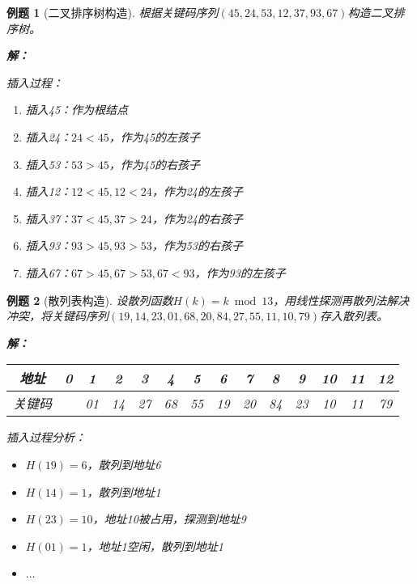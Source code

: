 \documentclass[12pt,a4paper]{amsart}
\newtheorem{example}{例题}[section]
\begin{document}
\begin{example}[二叉排序树构造]
根据关键码序列$(45,24,53,12,37,93,67)$构造二叉排序树。

\textbf{解：}
\begin{center}
\end{center}
插入过程：
\begin{enumerate}
\item 插入45：作为根结点
\item 插入24：$24 < 45$，作为45的左孩子
\item 插入53：$53 > 45$，作为45的右孩子
\item 插入12：$12 < 45, 12 < 24$，作为24的左孩子
\item 插入37：$37 < 45, 37 > 24$，作为24的右孩子
\item 插入93：$93 > 45, 93 > 53$，作为53的右孩子  
\item 插入67：$67 > 45, 67 > 53, 67 < 93$，作为93的左孩子
\end{enumerate}
\end{example}

\begin{example}[散列表构造]
设散列函数$H(k) = k \bmod 13$，用线性探测再散列法解决冲突，将关键码序列$(19,14,23,01,68,20,84,27,55,11,10,79)$存入散列表。

\textbf{解：}
\begin{center}
\begin{tabular}{|c|c|c|c|c|c|c|c|c|c|c|c|c|c|}
\hline
地址 & 0 & 1 & 2 & 3 & 4 & 5 & 6 & 7 & 8 & 9 & 10 & 11 & 12 \\
\hline
关键码 & & 01 & 14 & 27 & 68 & 55 & 19 & 20 & 84 & 23 & 10 & 11 & 79 \\
\hline
\end{tabular}
\end{center}

插入过程分析：
\begin{itemize}
\item $H(19) = 6$，散列到地址6
\item $H(14) = 1$，散列到地址1  
\item $H(23) = 10$，地址10被占用，探测到地址9
\item $H(01) = 1$，地址1空闲，散列到地址1
\item $\ldots$
\end{itemize}
\end{example}
\end{document}

